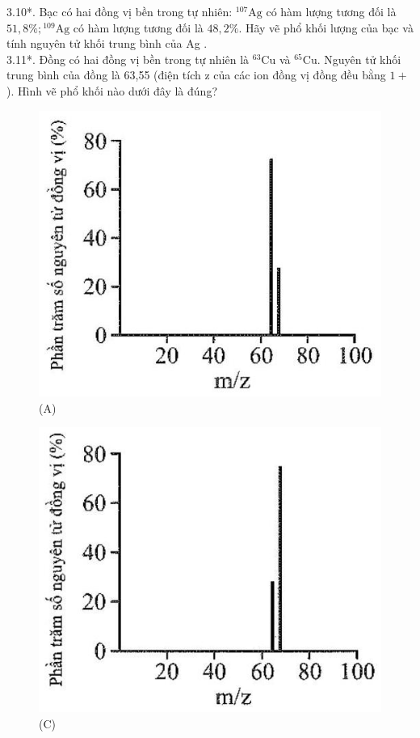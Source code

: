 \documentclass[10pt]{article}
\begin{document}
3.10*. Bạc có hai đồng vị bền trong tự nhiên: ${ }^{107} \mathrm{Ag}$ có hàm lượng tương đối là $51,8 \% ;{ }^{109} \mathrm{Ag}$ có hàm lượng tương đối là $48,2 \%$. Hãy vẽ phổ khối lượng của bạc và tính nguyên tử khối trung bình của Ag .\\
3.11*. Đồng có hai đồng vị bền trong tự nhiên là ${ }^{63} \mathrm{Cu}$ và ${ }^{65} \mathrm{Cu}$. Nguyên tử khối trung bình của đồng là 63,55 (điện tích z của các ion đồng vị đồng đều bằng $1+$ ). Hình vẽ phổ khối nào dưới đây là đúng?

\begin{figure}[h]
\begin{center}
  \includegraphics[width=\textwidth]{2025_10_23_76620c17ffac1ae9b35bg-07(2)}
\captionsetup{labelformat=empty}
\caption{(A)}
\end{center}
\end{figure}

\begin{figure}[h]
\begin{center}
  \includegraphics[width=\textwidth]{2025_10_23_76620c17ffac1ae9b35bg-07}
\captionsetup{labelformat=empty}
\caption{(C)}
\end{center}
\end{figure}
\end{document}
